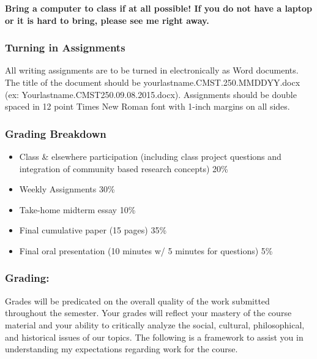\documentclass[]{article}
\providecommand{\tightlist}{%
  \setlength{\itemsep}{0pt}\setlength{\parskip}{0pt}}
\begin{document}
\textbf{Bring a computer to class if at all possible! If you do not have
a laptop or it is hard to bring, please see me right away.}

\subsubsection{Turning in Assignments}\label{turning-in-assignments}

All writing assignments are to be turned in electronically as Word
documents. The title of the document should be
yourlastname.CMST.250.MMDDYY.docx (ex:
Yourlastname.CMST250.09.08.2015.docx). Assignments should be double
spaced in 12 point Times New Roman font with 1-inch margins on all
sides.

\subsubsection{Grading Breakdown}\label{grading-breakdown}

\begin{itemize}
\tightlist
\item
  Class \& elsewhere participation (including class project questions
  and integration of community based research concepts) 20\%
\item
  Weekly Assignments 30\%
\item
  Take-home midterm essay 10\%
\item
  Final cumulative paper (15 pages) 35\%
\item
  Final oral presentation (10 minutes w/ 5 minutes for questions) 5\%
\end{itemize}

\subsubsection{Grading:}\label{grading}

Grades will be predicated on the overall quality of the work submitted
throughout the semester. Your grades will reflect your mastery of the
course material and your ability to critically analyze the social,
cultural, philosophical, and historical issues of our topics. The
following is a framework to assist you in understanding my expectations
regarding work for the course.
\end{document}
